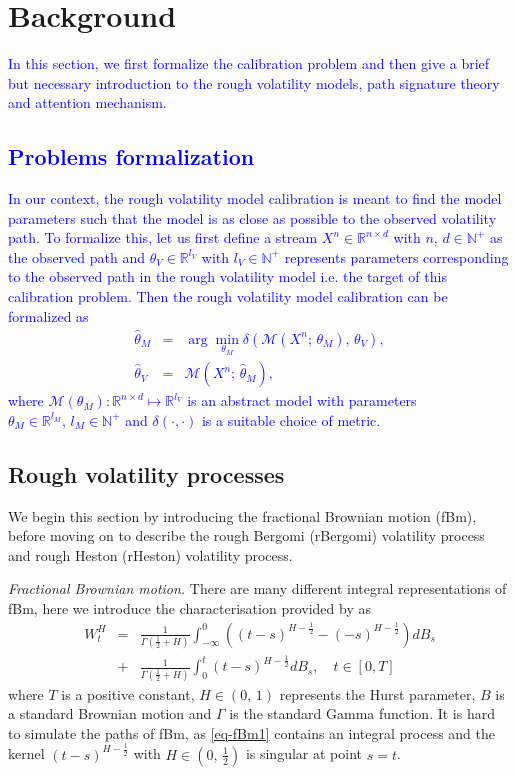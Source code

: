 \documentclass[]{article}
\renewcommand{\(}{\left(}
\renewcommand{\)}{\right)}
\begin{document}
	\section{Background}\label{sec-background}
	\textcolor{blue}{In this section, we first formalize the calibration problem and then give a brief but necessary introduction to the rough volatility models, path signature theory and attention mechanism.}

	\textcolor{blue}{\subsection{Problems formalization}\label{subsec-formalization}
	In our context, the rough volatility model calibration is meant to find the model parameters such that the model is as close as possible to the observed volatility path. To formalize this, let us first define a stream $X^n\in\mathbb{R}^{n\times d}$ with $n,\,d\in\mathbb{N}^+$ as the observed path and $\theta_V\in\mathbb{R}^{l_V}$ with $l_V\in\mathbb{N}^+$ represents parameters corresponding to the observed path in the rough volatility model i.e. the target of this calibration problem. Then the rough volatility model calibration can be formalized as 
	\begin{eqnarray}
		\widehat{\theta}_M&=&\arg\min\limits_{\theta_M}\delta\left(\mathcal{M}\(X^n;\,\theta_{M}\),\,\theta_V\right),\\
		\widehat{\theta}_V&=&\mathcal{M}\(X^n;\,\widehat{\theta}_{M}\),
	\end{eqnarray}
	where $\mathcal{M}(\theta_M):\mathbb{R}^{n\times d} \mapsto \mathbb{R}^{l_V}$ is an abstract model with parameters $\theta_M\in\mathbb{R}^{l_M},\,l_M\in\mathbb{N}^+$ and $\delta(\cdot,\cdot)$ is a suitable choice of metric.
	}
	
	
	
	\subsection{Rough volatility processes}\label{subsec-rough}
	We begin this section by introducing the fractional Brownian motion (fBm), before moving on to describe the rough Bergomi (rBergomi) volatility process and rough Heston (rHeston) volatility process.
	
	\textit{Fractional Brownian motion.} There are many different integral representations of fBm, here we introduce the characterisation provided by \cite{mandelbrot_1968_fbm} as
	\begin{eqnarray}
		\label{eq-fBm1}
		W_t^H
		&=& \frac{1}{\Gamma\(\frac{1}{2}+H\)}\int_{-\infty}^{0} ((t-s)^{H-\frac{1}{2}}-(-s)^{H-\frac{1}{2}})dB_s \nonumber\\
		&+& \frac{1}{\Gamma\(\frac{1}{2}+H\)}\int_{0}^{t} (t-s)^{H-\frac{1}{2}}dB_s,\quad t\in[0,T]
	\end{eqnarray}
	where $T$ is a positive constant, $H\in(0,\,1)$ represents the Hurst parameter, $B$ is a standard Brownian motion and $\Gamma$ is the standard Gamma function. It is hard to simulate the paths of fBm, as \eqref{eq-fBm1} contains an integral process and the kernel $(t-s)^{H-\frac{1}{2}}$ with $H\in(0,\,\frac{1}{2})$ is singular at point $s=t$.
	
\end{document}
